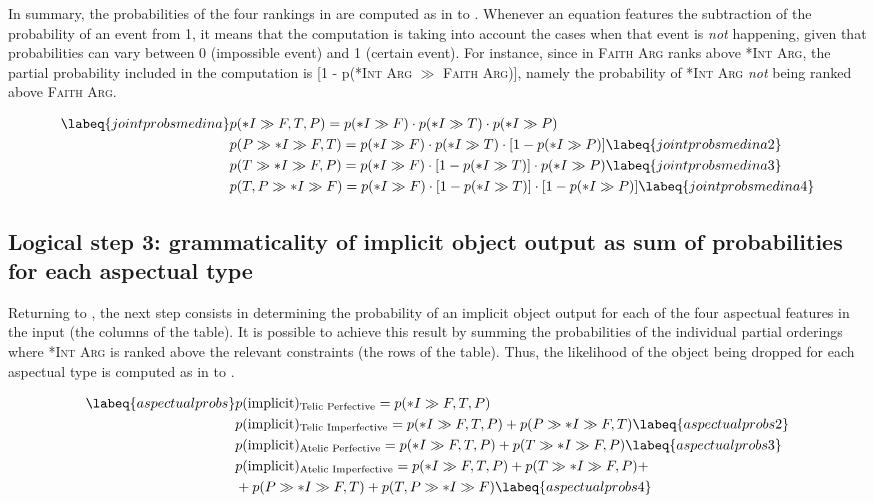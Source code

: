 In summary, the probabilities of the four rankings in  are computed as in  to . Whenever an equation features the subtraction of the probability of an event from 1, it means that the computation is taking into account the cases when that event is \textit{not} happening, given that probabilities can vary between 0 (impossible event) and 1 (certain event). For instance, since in  \textsc{Faith Arg} ranks above \textsc{*Int Arg}, the partial probability included in the computation is [1 - p(\textsc{*Int Arg} $\gg$ \textsc{Faith Arg})], namely the probability of \textsc{*Int Arg} \textit{not} being ranked above \textsc{Faith Arg}. 

\begin{align}  \labeq{jointprobsmedina} %
    & p(*I \gg {F, T, P}) = p(*I \gg F) \cdot p(*I \gg T) \cdot p(*I \gg P) \\
    & p(P \gg *I \gg {F, T}) = p(*I \gg F) \cdot p(*I \gg T) \cdot [1 - p(*I \gg P)] \labeq{jointprobsmedina2}\\
    & p(T \gg *I \gg {F, P}) = p(*I \gg F) \cdot [1 - p(*I \gg T)] \cdot p(*I \gg P) \labeq{jointprobsmedina3}\\
    & p({T, P} \gg *I \gg F) = p(*I \gg F) \cdot [1 - p(*I \gg T)] \cdot [1 - p(*I \gg P)] \labeq{jointprobsmedina4}
\end{align}

\subsection{Logical step 3: grammaticality of implicit object output as sum of probabilities for each aspectual type} 
Returning to , the next step consists in determining the probability of an implicit object output for each of the four aspectual features in the input (the columns of the table). It is possible to achieve this result by summing the probabilities of the individual partial orderings where \textsc{*Int Arg} is ranked above the relevant constraints (the rows of the table). Thus, the likelihood of the object being dropped for each aspectual type is computed as in  to .

\begin{align}  \labeq{aspectualprobs}
    & p(\text{implicit})\textsubscript{Telic Perfective} = p(*I \gg {F, T, P}) \\
    & p(\text{implicit})\textsubscript{Telic Imperfective} = p(*I \gg {F, T, P}) + p(P \gg *I \gg {F, T}) \labeq{aspectualprobs2}\\
    & p(\text{implicit})\textsubscript{Atelic Perfective} = p(*I \gg {F, T, P}) + p(T \gg *I \gg {F, P}) \labeq{aspectualprobs3}\\
    & p(\text{implicit})\textsubscript{Atelic Imperfective} = p(*I \gg {F, T, P}) + p(T \gg *I \gg {F, P}) + \nonumber \\ & + p(P \gg *I \gg {F, T}) + p({T, P} \gg *I \gg F) \labeq{aspectualprobs4}
\end{align}

